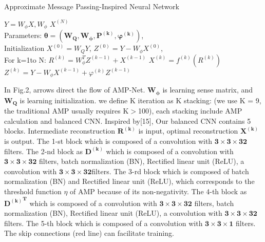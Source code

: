\documentclass[conference]{IEEEtran}
\begin{document}
\begin{algorithm}
\caption{Approximate Message Passing-Inspired Neural Network}
\label{alg:Approximate Message Passing-Inspired Neural Network}
\begin{algorithmic}
\REQUIRE $Y= W_\phi X, W_\phi$
\ENSURE $X^{(N)}$
\\Parameters: $\bm{\theta=(W_Q,W_\phi,P^{(k)},\varphi^{(k)})}$, 
\\Initialization
\STATE $X^{(0)}=W_QY$, 
\STATE $Z^{(0)}=Y-W_\phi X^{(0)}$,
\\For k=1to N:  
       \STATE $  R^{(k)}=W_\phi^T Z^{(k-1)}+X^{(k-1)}$
       \STATE $  X^{(k)}=f^{(k)} ( R^{(k)})$
        \STATE $ Z^{(k)}=Y- W_\phi X^{(k-1)}+  \varphi^{(k)} Z^{(k-1) }$
        \\

\end{algorithmic}
\end{algorithm}
In Fig.2, arrows direct the flow of AMP-Net. $\bm{ W_\phi}$ is learning sense matrix, and  $\bm{ W_Q}$ is learning initialization.
we define K iteration as K stacking: (we use K = 9, the traditional AMP usually requires K$\bm{>}$100), each stacking include AMP calculation and balanced CNN. Inspired by[15], Our balanced CNN contains 5 blocks. Intermediate reconstruction $\bm{ R^{(k)}}$ is input, optimal reconstruction $\bm{ X^{(k)}}$ is output. The 1-st block which is composed of a convolution with $\bm{3\times3\times32}$ filters. The 2-nd block as $\bm{ D^{(k)}}$ which is composed of a convolution with $\bm{3\times3\times32}$ filters, batch normalization (BN), Rectified linear unit (ReLU), a convolution with $\bm{3\times3\times32}$filters. The 3-rd block which is composed of batch normalization (BN) and Rectified linear unit (ReLU), which corresponds to the threshold function $\eta$ of AMP because of its non-negativity. The 4-th block as  $\bm{ {D^{(k)}}^T}$ which is composed of a convolution with $\bm{3\times3\times32}$ filters, batch normalization (BN), Rectified linear unit (ReLU), a convolution with $\bm{3\times3\times32}$ filters. The 5-th block which is composed of a convolution with $\bm{3\times3\times1}$ filters. The skip connections (red line) can facilitate training. 
\end{document}
